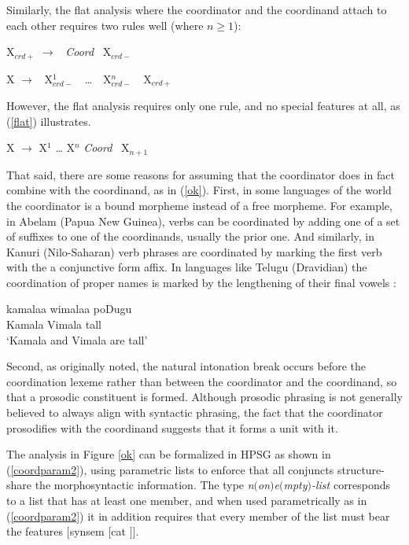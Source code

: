 \documentclass[output=paper
                ,modfonts
                ,nonflat
	        ,collection
	        ,collectionchapter
	        ,collectiontoclongg
 	        ,biblatex
                ,babelshorthands
                ,newtxmath
                ,draftmode
                ,colorlinks, citecolor=brown
]{./langsci/langscibook}
\begin{document}
\noindent
Similarly, the flat analysis where the coordinator and the coordinand attach to each other  requires two  rules well
(where $n \geq 1$):

\begin{exe}
\ex
\begin{xlista}
\ex X$_{crd+}$ $\rightarrow$ \, \emph{Coord} \, X$_{crd-}$
 
\ex X $\rightarrow$ \, X$^1_{crd-}$  \,\, \ldots{} \,\, X$^n_{crd-}$ \,\, X$_{crd+}$
\end{xlista}
\end{exe}\label{ok}

\noindent
However, the flat analysis requires only one rule, and no
special features at all, as (\ref{flat}) illustrates. 

\begin{exe}
\ex X  $\rightarrow$ X$^1$ \ldots{} X$^n$ \emph{Coord} \, X$_{n+1}$
\end{exe}\label{flat}

That said, there are some reasons for assuming that the coordinator does in fact combine with the coordinand, as in (\ref{ok}). First, in some  languages of the world the coordinator is a bound morpheme instead of a free morpheme.
For example, in Abelam (Papua New Guinea),  verbs can be coordinated by adding one of a set of suffixes to one of the coordinands, usually the prior one. And similarly, in Kanuri (Nilo-Saharan) verb phrases are coordinated by marking the first verb with the a conjunctive form affix. In languages like Telugu (Dravidian) the coordination of proper names is marked  by the lengthening of their final vowels \citep{Bender05}:

\begin{exe}
\ex \gll kamalaa wimalaa poDugu \\ 
 Kamala Vimala tall\\
\glt `Kamala and Vimala are tall'
\end{exe}



Second, as
\citet{Ross67a} originally noted, the natural intonation break occurs before the coordination lexeme rather than between the coordinator and the coordinand, so that a  prosodic constituent is formed.
Although prosodic phrasing is not generally believed to always align with syntactic phrasing, the fact that the coordinator prosodifies with the  coordinand suggests that it forms a unit with it.

 The analysis in Figure \ref{ok} can be formalized in HPSG as
 shown in  (\ref{coordparam2}),  using parametric lists  \citep{pollardsag} to enforce
 that all conjuncts structure-share the morphosyntactic information. The type \textit{n$($on$)$e$($mpty$)$-list} corresponds
 to a list that has at least one member, and when used parametrically as in (\ref{coordparam2}) it in addition requires that
 every member of the list must bear the features $[${\sc synsem} $[${\sc cat}  $]]$.
\end{document}
